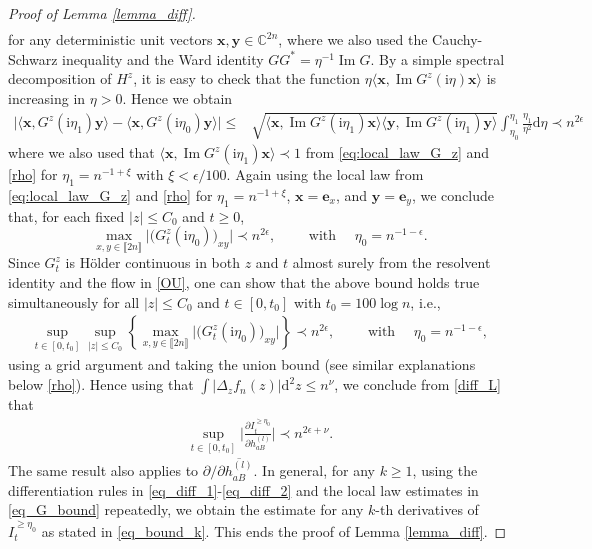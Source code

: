 \documentclass[10pt,reqno]{amsart}
\renewcommand{\Im}{\operatorname{Im}}
\newcommand{\II}{I^{\geq \eta_0}} %
\newcommand{\dd}{\mathrm{d}}
\newcommand{\ii}{\mathrm{i}}
\newcommand{\ie}{i.e., }
\newcommand{\<}{\langle}
\renewcommand{\>}{\rangle}
\numberwithin{equation}{section}
\begin{document}
\begin{proof}[Proof of Lemma \ref{lemma_diff}]
\begin{align}
\end{align}
for any deterministic unit vectors $\mathbf{x}, \mathbf{y}\in \mathbb{C}^{2n}$, where we also used the Cauchy-Schwarz inequality and the Ward identity $GG^*=\eta^{-1}\Im G$. By a simple spectral decomposition of $H^z$, it is easy to check that the function $\eta \big\langle \mathbf{x}, \Im G^z(\ii \eta) \mathbf{x} \big\rangle$ is increasing in $\eta>0$. Hence we obtain
\begin{align}
	\Big|\big\langle \mathbf{x}, G^z(\ii \eta_1)\mathbf{y} \big\rangle-\big\langle \mathbf{x}, G^z(\ii \eta_0)\mathbf{y} \big\rangle\Big|\leq & \sqrt{\big\langle \mathbf{x}, \Im G^z(\ii \eta_1) \mathbf{x} \big\rangle\big\langle \mathbf{y}, \Im G^z(\ii \eta_1) \mathbf{y} \big\rangle} \int_{\eta_0}^{\eta_1} \frac{\eta_1}{\eta^2} \dd \eta \prec  n^{2\epsilon}
\end{align}
where we also used that $\big\langle \mathbf{x}, \Im G^z(\ii \eta_1) \mathbf{x} \big\rangle \prec 1$ from \eqref{eq:local_law_G_z} and \eqref{rho} for $\eta_1=n^{-1+\xi}$ with $\xi<\epsilon/100$. Again using the local law from \eqref{eq:local_law_G_z} and \eqref{rho} for $\eta_1=n^{-1+\xi}$, $\mathbf{x}=\mathbf{e}_{x}$, and $\mathbf{y}=\mathbf{e}_{y}$, we conclude that, for each fixed $|z|\leq C_0$ and $t\geq 0$,
$$
\max_{x,y \in \llbracket 2n \rrbracket} \Big|\big( G^{z}_t(\ii \eta_0) \big)_{xy}\Big| \prec n^{2\epsilon}, \qquad \mbox{~with~} \quad \eta_0=n^{-1-\epsilon}.
$$
 Since $G^{z}_t$ is  H\"{o}lder continuous in both $z$ and $t$ almost surely from the resolvent identity and the flow in \eqref{OU}, one can show that the above bound holds true simultaneously for all $|z|\leq C_0$ and $t\in [0,t_0]$ with $t_0=100\log n$, \ie
\begin{align}\label{eq_G_bound}
	\sup_{t\in [0,t_0]} \sup_{|z|\leq C_0} \left\{ \max_{x,y \in \llbracket 2n \rrbracket} \Big|\big( G^{z}_t(\ii \eta_0) \big)_{xy}\Big| \right\} \prec n^{2\epsilon}, \qquad \mbox{~with~} \quad \eta_0=n^{-1-\epsilon},
\end{align}
 using a grid argument and taking the union bound (see similar explanations below \eqref{rho}).
Hence using that $\int|\Delta_z f_n(z)| \dd^2 z  \leq n^{\nu}$, we conclude from \eqref{diff_L} that
\begin{align}
	\sup_{t\in [0,t_0]} \Big|\frac{\partial \II_t }{\partial h^{(l)}_{aB}}\Big|  \prec n^{2\epsilon+\nu}.
\end{align} 
The same result also applies to $\partial /\partial \overline{h^{(l)}_{aB}}$. In general, for any $k\geq 1$, using the differentiation rules in \eqref{eq_diff_1}-\eqref{eq_diff_2} and the local law estimates in \eqref{eq_G_bound} repeatedly, we obtain the estimate for any $k$-th derivatives of $\II_t$ as stated in \eqref{eq_bound_k}. This ends the proof of Lemma \ref{lemma_diff}.
\end{proof}
\end{document}
